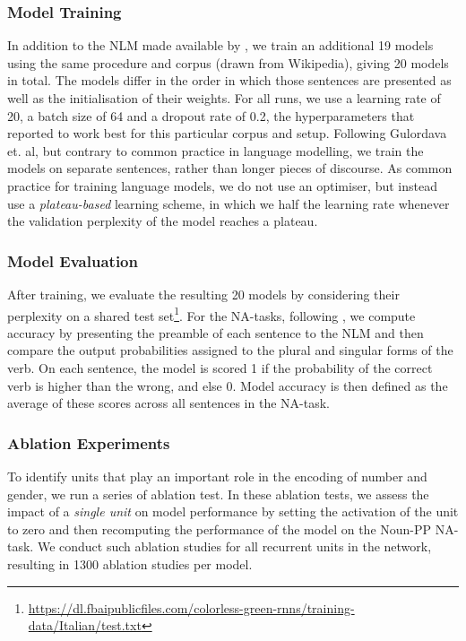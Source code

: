\subsubsection{Model Training} 
In addition to the NLM made available by \citet{Gulordava:etal:2018}, we train an additional 19 models using the same procedure and corpus (drawn from Wikipedia), giving 20 models in total. 
The models differ in the order in which those sentences are presented as well as the initialisation of their weights.
For all runs, we use a learning rate of 20, a batch size of 64 and a dropout rate of 0.2, the hyperparameters that \citet{Gulordava:etal:2018} reported to work best for this particular corpus and setup.
Following Gulordava et. al, but contrary to common practice in language modelling, we train the models on separate sentences, rather than longer pieces of discourse.
As common practice for training language models, we do not use an optimiser, but instead use a \emph{plateau-based} learning scheme, in which we half the learning rate whenever the validation perplexity of the model reaches a plateau.

\subsubsection{Model Evaluation} After training, we evaluate the resulting 20 models by considering their perplexity on a shared test set\footnote{\url{https://dl.fbaipublicfiles.com/colorless-green-rnns/training-data/Italian/test.txt}}. For the NA-tasks, following \citet{Linzen:etal:2016}, we compute accuracy by presenting the preamble of each sentence to the NLM and then compare the output probabilities assigned to the plural and singular forms of the verb. On each sentence, the model is scored 1 if the probability of the correct verb is higher than the wrong, and else 0. Model accuracy is then defined as the average of these scores across all sentences in the NA-task.

\subsubsection{Ablation Experiments}
To identify units that play an important role in the encoding of number and gender, we run a series of ablation test.
In these ablation tests, we assess the impact of a \emph{single unit} on model performance by setting the activation of the unit to zero and then recomputing the performance of the model on the Noun-PP NA-task. 
We conduct such ablation studies for all recurrent units in the network, resulting in 1300 ablation studies per model.

